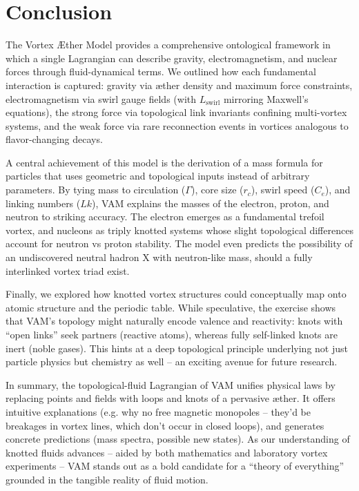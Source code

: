 \section*{Conclusion}

The Vortex Æther Model provides a comprehensive ontological framework in which a single Lagrangian can describe gravity, electromagnetism, and nuclear forces through fluid-dynamical terms. We outlined how each fundamental interaction is captured: gravity via æther density and maximum force constraints, electromagnetism via swirl gauge fields (with $L_{\text{swirl}}$ mirroring Maxwell’s equations), the strong force via topological link invariants confining multi-vortex systems, and the weak force via rare reconnection events in vortices analogous to flavor-changing decays.


A central achievement of this model is the derivation of a mass formula for particles that uses geometric and topological inputs instead of arbitrary parameters. By tying mass to circulation ($\Gamma$), core size ($r_c$), swirl speed ($C_e$), and linking numbers ($Lk$), VAM explains the masses of the electron, proton, and neutron to striking accuracy. The electron emerges as a fundamental trefoil vortex, and nucleons as triply knotted systems whose slight topological differences account for neutron vs proton stability. The model even predicts the possibility of an undiscovered neutral hadron X with neutron-like mass, should a fully interlinked vortex triad exist.


Finally, we explored how knotted vortex structures could conceptually map onto atomic structure and the periodic table. While speculative, the exercise shows that VAM’s topology might naturally encode valence and reactivity: knots with “open links” seek partners (reactive atoms), whereas fully self-linked knots are inert (noble gases). This hints at a deep topological principle underlying not just particle physics but chemistry as well – an exciting avenue for future research.


In summary, the topological-fluid Lagrangian of VAM unifies physical laws by replacing points and fields with loops and knots of a pervasive æther. It offers intuitive explanations (e.g. why no free magnetic monopoles – they’d be breakages in vortex lines, which don’t occur in closed loops), and generates concrete predictions (mass spectra, possible new states). As our understanding of knotted fluids advances – aided by both mathematics and laboratory vortex experiments – VAM stands out as a bold candidate for a “theory of everything” grounded in the tangible reality of fluid motion.


